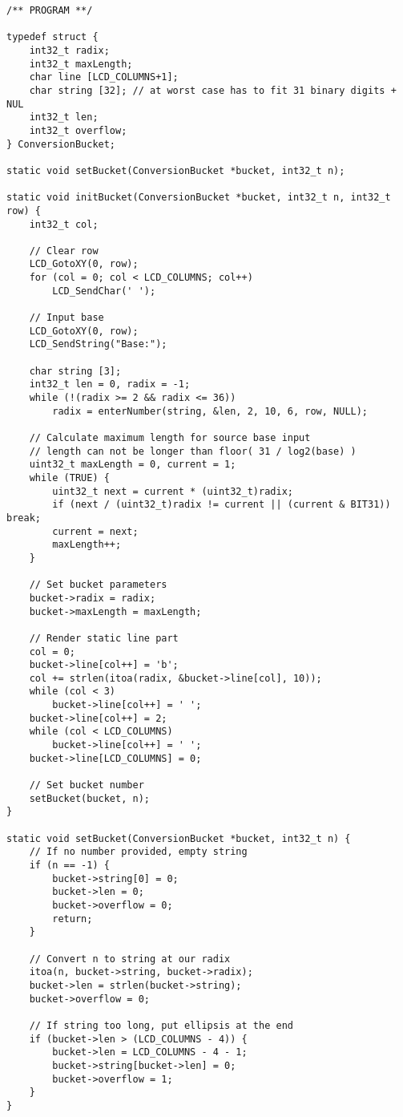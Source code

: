 \begin{verbatim}
/** PROGRAM **/

typedef struct {
    int32_t radix;
    int32_t maxLength;
    char line [LCD_COLUMNS+1];
    char string [32]; // at worst case has to fit 31 binary digits + NUL
    int32_t len;
    int32_t overflow;
} ConversionBucket;

static void setBucket(ConversionBucket *bucket, int32_t n);

static void initBucket(ConversionBucket *bucket, int32_t n, int32_t row) {
    int32_t col;

    // Clear row
    LCD_GotoXY(0, row);
    for (col = 0; col < LCD_COLUMNS; col++)
        LCD_SendChar(' ');

    // Input base
    LCD_GotoXY(0, row);
    LCD_SendString("Base:");

    char string [3];
    int32_t len = 0, radix = -1;
    while (!(radix >= 2 && radix <= 36))
        radix = enterNumber(string, &len, 2, 10, 6, row, NULL);

    // Calculate maximum length for source base input
    // length can not be longer than floor( 31 / log2(base) )
    uint32_t maxLength = 0, current = 1;
    while (TRUE) {
        uint32_t next = current * (uint32_t)radix;
        if (next / (uint32_t)radix != current || (current & BIT31)) break;
        current = next;
        maxLength++;
    }

    // Set bucket parameters
    bucket->radix = radix;
    bucket->maxLength = maxLength;

    // Render static line part
    col = 0;
    bucket->line[col++] = 'b';
    col += strlen(itoa(radix, &bucket->line[col], 10));
    while (col < 3)
        bucket->line[col++] = ' ';
    bucket->line[col++] = 2;
    while (col < LCD_COLUMNS)
        bucket->line[col++] = ' ';
    bucket->line[LCD_COLUMNS] = 0;

    // Set bucket number
    setBucket(bucket, n);
}

static void setBucket(ConversionBucket *bucket, int32_t n) {
    // If no number provided, empty string
    if (n == -1) {
        bucket->string[0] = 0;
        bucket->len = 0;
        bucket->overflow = 0;
        return;
    }

    // Convert n to string at our radix
    itoa(n, bucket->string, bucket->radix);
    bucket->len = strlen(bucket->string);
    bucket->overflow = 0;

    // If string too long, put ellipsis at the end
    if (bucket->len > (LCD_COLUMNS - 4)) {
        bucket->len = LCD_COLUMNS - 4 - 1;
        bucket->string[bucket->len] = 0;
        bucket->overflow = 1;
    }
}


\end{verbatim}
